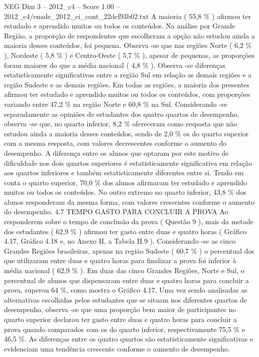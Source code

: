 \begin{textsample}{NEG Dim 3 – 2012\_c4 – Score 1.00 – 2012\_c4/enade\_2012\_ci\_cont\_22dcf93b02.txt}
A maioria ( 55,8 \% ) afirmou ter estudado e aprendido muitos ou todos os conteúdos.
Na análise por Grande Região, a proporção de respondentes que escolheram a opção não estudou ainda a maioria desses conteúdos, foi pequena.
Observa -se que nas regiões Norte ( 6,2 \% ), Nordeste ( 5,8 \% ) e Centro-Oeste ( 5,7 \% ), apesar de pequenas, as proporções foram maiores do que a média nacional ( 4,8 \% ).
Observa -se diferenças estatisticamente significativas entre a região Sul em relação as demais regiões e a região Sudeste e as demais regiões.
Em todas as regiões, a maioria dos presentes afirmou ter estudado e aprendido muitos ou todos os conteúdos, com proporções variando entre 47,2 \% na região Norte e 60,8 \% na Sul.
Considerando -se separadamente as opiniões de estudantes dos quatro quartos de desempenho, observa -se que, no quarto inferior, 8,2 \% ofereceram como resposta que não estudou ainda a maioria desses conteúdos, sendo de 2,0 \% os do quarto superior com a mesma resposta, com valores decrescentes conforme o aumento do desempenho.
A diferença entre os alunos que optaram por este motivo de dificuldade nos dois quartos superiores é estatisticamente significativa em relação aos quartos inferiores e também estatisticamente diferentes entre si.
Tendo em conta o quarto superior, 70,0 \% dos alunos afirmaram ter estudado e aprendido muitos ou todos os conteúdos.
No outro extremo no quarto inferior, 43,8 \% dos alunos responderam da mesma forma, com valores crescentes conforme o aumento do desempenho. 4.7 TEMPO GASTO PARA CONCLUIR A PROVA Ao responderem sobre o tempo de conclusão da prova ( Questão 9 ), mais da metade dos estudantes ( 62,9 \% ) afirmou ter gasto entre duas e quatro horas ( Gráfico 4.17, Gráfico 4.18 e, no Anexo II, a Tabela II.9 ).
Considerando -se as cinco Grandes Regiões brasileiras, apenas na região Sudeste ( 60,7 \% ) o percentual dos que utilizaram entre duas e quatro horas para finalizar a prova foi inferior à média nacional ( 62,9 \% ).
Em duas das cinco Grandes Regiões, Norte e Sul, o percentual de alunos que dispensaram entre duas e quatro horas para concluir a prova, superou 64 \%, como mostra o Gráfico 4.17.
Uma vez sendo analisadas as alternativas escolhidas pelos estudantes que se situam nos diferentes quartos de desempenho, observa -se que uma proporção bem maior de participantes no quarto superior declarou ter gasto entre duas e quatro horas para concluir a prova quando comparados com os do quarto inferior, respectivamente 75,5 \% e 46,5 \%.
As diferenças entre os quatro quartos são estatisticamente significativas e evidenciam uma tendência crescente conforme o aumento de desempenho.

\end{textsample}
